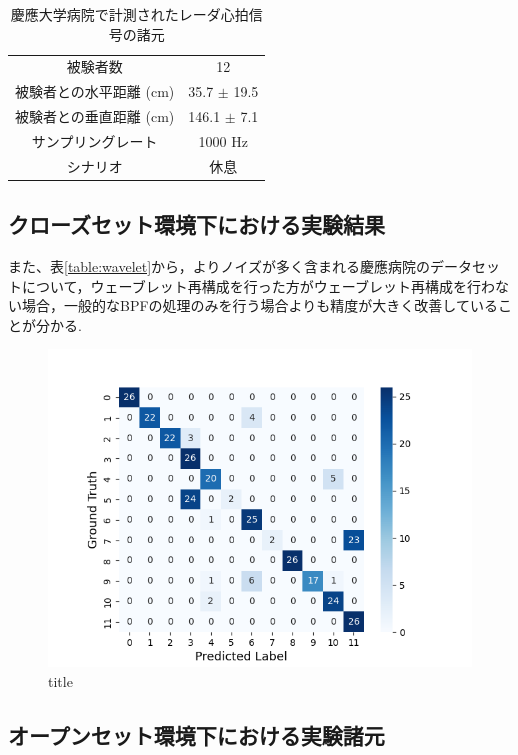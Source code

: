 \begin{table}[H]
  \caption{慶應大学病院で計測されたレーダ心拍信号の諸元}
  \centering
  \begin{tabular}{cc}
  \hline
  被験者数 & 12 \\
  被験者との水平距離 (cm) & 35.7 $\pm$ 19.5 \\
  被験者との垂直距離 (cm) & 146.1 $\pm$ 7.1 \\
  サンプリングレート & 1000 Hz \\
  シナリオ & 休息 \\
  \hline
  \end{tabular}
  \label{table:keio_hospital}
  \end{table}

\subsection{クローズセット環境下における実験結果}

また、表\ref{table:wavelet}から，よりノイズが多く含まれる慶應病院のデータセットについて，ウェーブレット再構成を行った方がウェーブレット再構成を行わない場合，一般的なBPFの処理のみを行う場合よりも精度が大きく改善していることが分かる.

\begin{figure}[H]
\begin{center}
\includegraphics[width=\linewidth]{./fig/noisy_dataset/cross_val_Fold0_close.png}
\end{center}
\caption{title}
\end{figure}

\subsection{オープンセット環境下における実験諸元}

